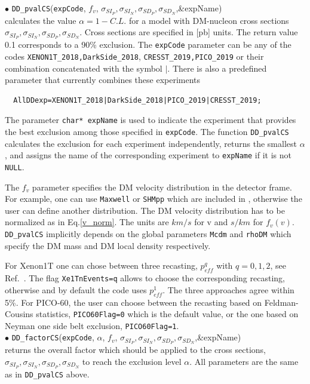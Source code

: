 \documentclass[12pt,a4paper]{article}
\begin{document}
\noindent
$\bullet$ \verb|DD_pvalCS|(\verb|expCode|, $f_v$, $\sigma_{SI_P},\sigma_{SI_N},\sigma_{SD_P}, \sigma_{SD_N}$,\&expName)\\
calculates the  value $\alpha= 1-C.L.$  for a model with DM-nucleon cross sections 
$\sigma_{SI_P},\sigma_{SI_N},\sigma_{SD_P}, \sigma_{SD_N}$. Cross sections are specified in
[pb] units. The return value 0.1 corresponds to a 90\% exclusion.   
 The {\tt expCode} parameter can be any of the codes  \verb|XENON1T_2018,DarkSide_2018|, \verb|CRESST_2019,PICO_2019| or their combination concatenated with the symbol
$\mid$. There is also a predefined parameter that  currently combines these experiments 
\begin{verbatim}
  AllDDexp=XENON1T_2018|DarkSide_2018|PICO_2019|CRESST_2019;
\end{verbatim}

The parameter {\tt char* expName}  is used to indicate the   experiment that  provides
the best exclusion among those specified in  {\tt expCode}.   The function {\tt DD\_pvalCS } calculates the
exclusion for each experiment  independently, returns the smallest $\alpha$, and assigns the 
name of the corresponding experiment to  {\tt expName}  if it is not {\tt NULL}.  

The $f_v$ parameter specifies the DM velocity distribution in the detector frame. For
example, one can use   {\tt Maxwell} or {\tt SHMpp} which are
included in \micro, 
otherwise the user can define another distribution.   
The DM velocity distribution  has to be normalized  as in Eq.\ref{v_norm}.
 The units  are $km/s$ for v and $s/km$ for  $f_v(v)$. {\tt DD\_pvalCS} implicitly depends on the 
global parameters  {\tt Mcdm}  and  {\tt rhoDM} which specify the DM mass and DM  local density respectively.


For  Xenon1T one can chose  between  three recasting, $p_{eff}^{q}$ with $q=0,1,2$, 
see Ref.~\cite{Belanger:2020gnr}. The  flag {\tt Xe1TnEvents=q} allows to choose the  corresponding recasting,  otherwise and by default the code uses  $p_{eff}^1$. The three approaches agree  within 5\%. For PICO-60, the user can choose between the recasting based on Feldman-Cousins statistics, {\tt PICO60Flag=0} 
which is the default value, or the one based on  Neyman one side belt exclusion, {\tt PICO60Flag=1}.\\ 



\noindent
$\bullet$ \verb|DD_factorCS|(\verb|expCode|, $\alpha$, $f_v$, $\sigma_{SI_P},\sigma_{SI_N},\sigma_{SD_P},\sigma_{SD_N}$,\&expName)\\ 
returns the overall factor which should be applied to the cross sections, $\sigma_{SI_P},\sigma_{SI_N},\sigma_{SD_P}, \sigma_{SD_N}$ to reach  the exclusion level $\alpha$.  
All parameters are the same as in {\tt DD\_pvalCS} above. \\
\end{document}
